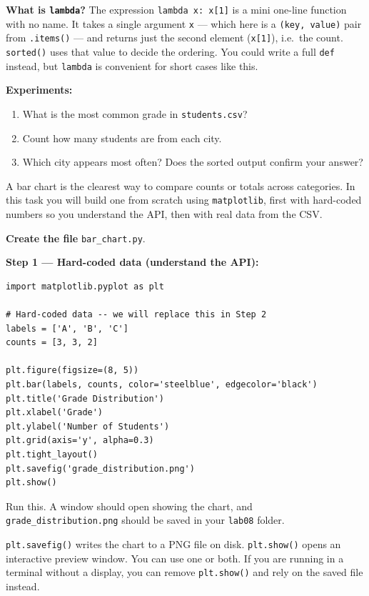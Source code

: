 \documentclass{cslab}
\begin{document}
\begin{hint}
\textbf{What is \texttt{lambda}?} The expression \texttt{lambda x: x[1]} is a mini one-line function with no name. It takes a single argument \texttt{x} --- which here is a \texttt{(key, value)} pair from \texttt{.items()} --- and returns just the second element (\texttt{x[1]}), i.e.\ the count. \texttt{sorted()} uses that value to decide the ordering. You could write a full \texttt{def} instead, but \texttt{lambda} is convenient for short cases like this.
\end{hint}

\textbf{Experiments:}
\begin{enumerate}
    \item What is the most common grade in \texttt{students.csv}?
    \item Count how many students are from each city.
    \item Which city appears most often? Does the sorted output confirm your answer?
\end{enumerate}


A bar chart is the clearest way to compare counts or totals across categories. In this task you will build one from scratch using \texttt{matplotlib}, first with hard-coded numbers so you understand the API, then with real data from the CSV.

\textbf{Create the file} \texttt{bar\_chart.py}.

\textbf{Step 1 --- Hard-coded data (understand the API):}

\begin{lstlisting}
import matplotlib.pyplot as plt

# Hard-coded data -- we will replace this in Step 2
labels = ['A', 'B', 'C']
counts = [3, 3, 2]

plt.figure(figsize=(8, 5))
plt.bar(labels, counts, color='steelblue', edgecolor='black')
plt.title('Grade Distribution')
plt.xlabel('Grade')
plt.ylabel('Number of Students')
plt.grid(axis='y', alpha=0.3)
plt.tight_layout()
plt.savefig('grade_distribution.png')
plt.show()
\end{lstlisting}

Run this. A window should open showing the chart, and \texttt{grade\_distribution.png} should be saved in your \texttt{lab08} folder.

\begin{note}
\texttt{plt.savefig()} writes the chart to a PNG file on disk. \texttt{plt.show()} opens an interactive preview window. You can use one or both. If you are running in a terminal without a display, you can remove \texttt{plt.show()} and rely on the saved file instead.
\end{note}
\end{document}
